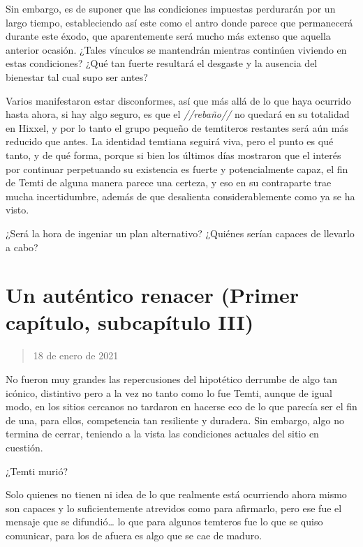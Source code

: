 \documentclass[
  spanish,
]{book}
\begin{document}
Sin embargo, es de suponer que las condiciones impuestas perdurarán por un largo tiempo, estableciendo así este como el antro donde parece que permanecerá durante este éxodo, que aparentemente será mucho más extenso que aquella anterior ocasión. ¿Tales vínculos se mantendrán mientras continúen viviendo en estas condiciones? ¿Qué tan fuerte resultará el desgaste y la ausencia del bienestar tal cual supo ser antes?

Varios manifestaron estar disconformes, así que más allá de lo que haya ocurrido hasta ahora, si hay algo seguro, es que el \emph{//rebaño//} no quedará en su totalidad en Hixxel, y por lo tanto el grupo pequeño de temtiteros restantes será aún más reducido que antes. La identidad temtiana seguirá viva, pero el punto es qué tanto, y de qué forma, porque si bien los últimos días mostraron que el interés por continuar perpetuando su existencia es fuerte y potencialmente capaz, el fin de Temti de alguna manera parece una certeza, y eso en su contraparte trae mucha incertidumbre, además de que desalienta considerablemente como ya se ha visto.

¿Será la hora de ingeniar un plan alternativo? ¿Quiénes serían capaces de llevarlo a cabo?

\hypertarget{un-autuxe9ntico-renacer-primer-capuxedtulo-subcapuxedtulo-iii}{%
\section{Un auténtico renacer (Primer capítulo, subcapítulo III)}\label{un-autuxe9ntico-renacer-primer-capuxedtulo-subcapuxedtulo-iii}}

\begin{quote}
18 de enero de 2021
\end{quote}

No fueron muy grandes las repercusiones del hipotético derrumbe de algo tan icónico, distintivo pero a la vez no tanto como lo fue Temti, aunque de igual modo, en los sitios cercanos no tardaron en hacerse eco de lo que parecía ser el fin de una, para ellos, competencia tan resiliente y duradera. Sin embargo, algo no termina de cerrar, teniendo a la vista las condiciones actuales del sitio en cuestión.

¿Temti murió?

Solo quienes no tienen ni idea de lo que realmente está ocurriendo ahora mismo son capaces y lo suficientemente atrevidos como para afirmarlo, pero ese fue el mensaje que se difundió\ldots{} lo que para algunos temteros fue lo que se quiso comunicar, para los de afuera es algo que se cae de maduro.
\end{document}
